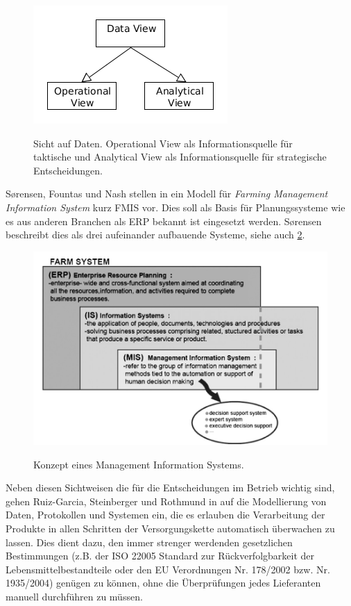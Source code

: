 \begin{figure}[h]
 \includegraphics[natwidth=\textwidth]{figures/datamodelling/dataviews.png}
 \centering
 \label{fig:dataviews}
 \caption{Sicht auf Daten. Operational View als Informationsquelle für taktische und Analytical View als Informationsquelle für strategische Entscheidungen.}
\end{figure}

S\o rensen, Fountas und Nash stellen in \cite{jour:Sorensen2010} ein Modell für \textit{Farming Management Information System} kurz FMIS vor. Dies soll als Basis für Planungssysteme wie es aus anderen Branchen als ERP bekannt ist eingesetzt werden. S\o rensen beschreibt dies als drei aufeinander aufbauende Systeme, siehe auch \ref{fig:fmishierarchy}.

\begin{figure}[h]
 \includegraphics[scale=0.5,natwidth=\textwidth]{figures/datamodelling/sorensen_fmis_2010.png}
 \centering
 \label{fig:fmishierarchy}
 \caption{Konzept eines Management Information Systems.\cite{jour:Sorensen2010}}
\end{figure}

Neben diesen Sichtweisen die für die Entscheidungen im Betrieb wichtig sind, gehen Ruiz-Garcia, Steinberger und Rothmund in \cite{jour:Ruiz-Garcia2010} auf die Modellierung von Daten, Protokollen und Systemen ein, die es erlauben die Verarbeitung der Produkte in allen Schritten der Versorgungskette automatisch überwachen zu lassen. Dies dient dazu, den immer strenger werdenden gesetzlichen Bestimmungen (z.B. der ISO 22005 Standard zur Rückverfolgbarkeit der Lebensmittelbestandteile oder den EU Verordnungen Nr. 178/2002 bzw. Nr. 1935/2004) genügen zu können, ohne die Überprüfungen jedes Lieferanten manuell durchführen zu müssen.

